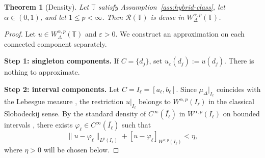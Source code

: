 \documentclass[11pt,a4paper]{article}
\numberwithin{equation}{section}
\newtheorem{theorem}{Theorem}[section]
\theoremstyle{definition}
\begin{document}
\begin{theorem}[Density]\label{thm:density}
Let $\mathbb{T}$ satisfy Assumption~\ref{ass:hybrid-class}, let $\alpha \in (0,1)$, 
and let $1 \le p < \infty$. Then $\mathcal{R}(\mathbb{T})$ is dense in 
$W^{\alpha,p}_\Delta(\mathbb{T})$.
\end{theorem}

\begin{proof}
Let $u \in W^{\alpha,p}_\Delta(\mathbb{T})$ and $\varepsilon > 0$. We construct 
an approximation on each connected component separately.

\smallskip
\noindent\textbf{Step 1: singleton components.} If $C = \{d_j\}$, set 
$u_\varepsilon(d_j) := u(d_j)$. There is nothing to approximate.

\smallskip
\noindent\textbf{Step 2: interval components.} Let $C = I_\ell = [a_\ell, b_\ell]$. 
Since $\mu_\Delta\big|_{I_\ell}$ coincides with the Lebesgue measure 
\cite[Theorem 5.2]{CabadaVivero2006}, the restriction $u|_{I_\ell}$ belongs to 
$W^{\alpha,p}(I_\ell)$ in the classical Slobodeckij sense. By the standard 
density of $C^\infty(\overline{I_\ell})$ in $W^{\alpha,p}(I_\ell)$ on bounded 
intervals \cite[Theorem 2.4]{DiNezzaPalatucciValdinoci2012}, there exists 
$\varphi_\ell \in C^\infty(\overline{I_\ell})$ such that
\[
\|u - \varphi_\ell\|_{L^p(I_\ell)} 
+ [u - \varphi_\ell]_{W^{\alpha,p}(I_\ell)} 
< \eta,
\]
where $\eta > 0$ will be chosen below.


\end{proof}
\end{document}
